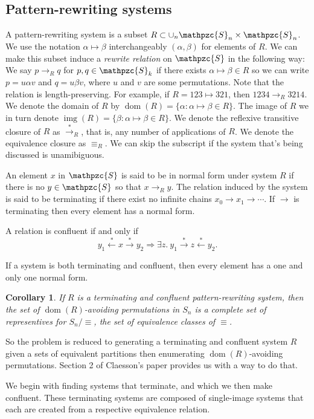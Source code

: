 \documentclass[a4paper, 11pt]{article}
\newtheorem{corollary}[theorem]{Corollary}
\theoremstyle{definition}
\newcommand{\Sym}{\mathpzc{S}}
\newcommand{\from}{\leftarrow}
\newcommand{\tostar}{\stackrel{*}{\to}}
\newcommand{\fromstar}{\stackrel{*}{\from}}
\DeclareMathOperator{\dom}{dom}
\DeclareMathOperator{\img}{img}
\begin{document}
\subsection{Pattern-rewriting systems}
A pattern-rewriting system is a subset $R \subset \cup_n \Sym_n \times \Sym_n$.
We use the notation $\alpha \mapsto \beta$ interchangeably $(\alpha, \beta)$ for elements of
$R$.
We can make this subset induce a \emph{rewrite relation} on $\Sym$ in the following way: We say
$p \to_R q$ for $p, q \in \Sym_k$ if there exists $\alpha \mapsto \beta \in R$ so
we can write $p = u \alpha v$ and $q = u \beta v$, where
$u$ and $v$ are some permutations.  Note that the relation is
length-preserving.  For example, if $R = {123 \mapsto 321}$, then $1234 \to_R 3214$. 
We denote the domain of $R$ by $\dom(R) = \{\alpha : \alpha \mapsto \beta \in
R\}$. The image of $R$ we in turn denote $\img(R) = \{\beta : \alpha \mapsto \beta \in
R\}$. We denote the reflexive transitive closure of $R$ as $\tostar_R$, that is,
any number of applications of $R$. We denote the equivalence closure as
$\equiv_R$. We can skip the subscript if the system that's being discussed is
unamibiguous. 

An element $x$ in $\Sym$ is said to be in normal form under system $R$ if there
is no $y \in \Sym$ so that $x \to_R y$. The relation induced by the system is
said to be terminating if there exist no infinite chains $x_0 \to x_1 \to
\cdots$. If $\to$ is terminating then every element has a normal form. 

A relation is confluent if and only if
$$
    y_1 \fromstar x \tostar y_2 \Longrightarrow 
    \exists z. \  y_1 \tostar z \fromstar y_2.
$$

If a system is both terminating and confluent, then every element has a one and
only one normal form.

\begin{corollary}
    If $R$ is a terminating and confluent pattern-rewriting system, then the set
    of $\dom(R)$-avoiding permutations in $S_n$ is a complete set of
    representives for $S_n / \equiv$, the set of equivalence classes of
    $\equiv$.
\end{corollary}

So the problem is reduced to generating a terminating and confluent system $R$
given a sets of equivalent partitions then enumerating $\dom(R)$-avoiding permutations.
Section 2 of Claesson's paper provides us with a way to do that. \cite{claesson}

We begin with finding systems that terminate, and which we then make confluent.
These terminating systems are composed of single-image systems that each are
created from a respective equivalence relation.
\end{document}
